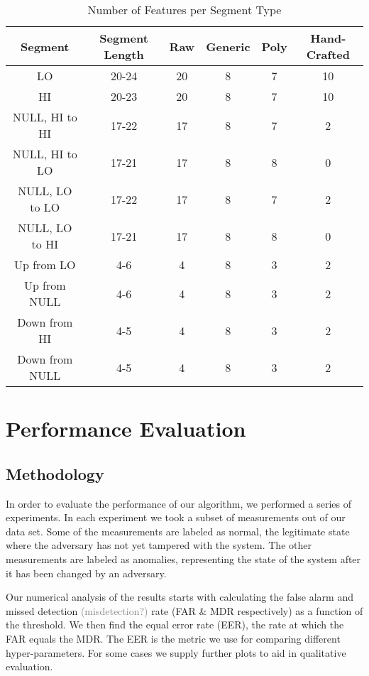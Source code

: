 \documentclass[conference]{IEEEtran}
\begin{document}
  \begin{table}
    \caption{Number of Features per Segment Type}
    \label{tab:feature_set_sizes}
    \centering
    \begin{tabular}{|c c c c c c|} 
      \hline
      Segment & Segment Length & Raw & Generic & Poly & Hand-Crafted \\ [0.5ex] 
      \hline\hline
      LO & 20-24 & 20 & 8 & 7 & 10 \\
      \hline
      HI & 20-23 & 20 & 8 & 7 & 10 \\
      \hline
      NULL, HI to HI & 17-22 & 17 & 8 & 7 & 2 \\
      \hline
      NULL, HI to LO & 17-21 & 17 & 8 & 8 & 0 \\
      \hline
      NULL, LO to LO & 17-22 & 17 & 8 & 7 & 2 \\
      \hline
      NULL, LO to HI & 17-21 & 17 & 8 & 8 & 0 \\
      \hline
      Up from LO & 4-6 & 4 & 8 & 3 & 2 \\
      \hline
      Up from NULL & 4-6 & 4 & 8 & 3 & 2 \\
      \hline
      Down from HI & 4-5 & 4 & 8 & 3 & 2 \\
      \hline
      Down from NULL & 4-5 & 4 & 8 & 3 & 2 \\
      \hline
    \end{tabular}
  \end{table}
  
 
\section{Performance Evaluation}

\subsection{Methodology}
  In order to evaluate the performance of our algorithm, we performed a series of experiments. In each experiment we took a subset of measurements out of our data set. Some of the measurements are labeled as normal, the legitimate state where the adversary has not yet tampered with the system. The other measurements are labeled as anomalies, representing the state of the system after it has been changed by an adversary.
  
  Our numerical analysis of the results starts with calculating the false alarm and missed detection \textcolor{gray}{(misdetection?)} rate (FAR \& MDR respectively) as a function of the threshold. We then find the equal error rate (EER), the rate at which the FAR equals the MDR. The EER is the metric we use for comparing different hyper-parameters. For some cases we supply further plots to aid in qualitative evaluation.
  
\end{document}
